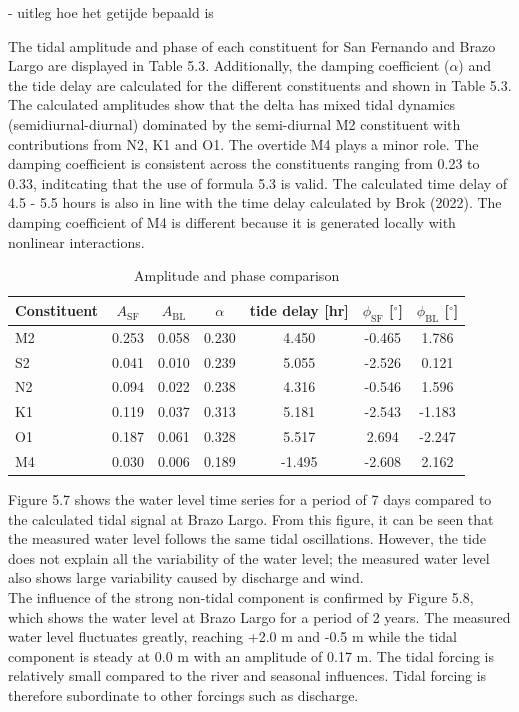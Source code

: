 - uitleg hoe het getijde bepaald is

The tidal amplitude and phase of each constituent for San Fernando and Brazo Largo are displayed in Table 5.3. Additionally, the damping coefficient ($\alpha$) and the tide delay are calculated for the different constituents and shown in Table 5.3. The calculated amplitudes show that the delta has mixed tidal dynamics  (semidiurnal-diurnal)
dominated by the semi-diurnal M2 constituent with contributions from N2, K1 and O1. The overtide M4 plays a minor role. The damping coefficient is consistent across the constituents ranging from 0.23 to 0.33, inditcating that the use of formula 5.3 is valid. The calculated time delay of 4.5 - 5.5 hours is also in line with the time delay calculated by Brok (2022). The damping coefficient of M4 is different because it is generated locally with nonlinear interactions.

\begin{table}[h!]
\centering
\caption{Amplitude and phase comparison}
\begin{tabular}{lcccccc}
\hline
Constituent & $A_{\text{SF}}$ & $A_{\text{BL}}$ & $\alpha$ & tide delay [hr] & $\phi_{\text{SF}}$ [$^\circ$] & $\phi_{\text{BL}}$ [$^\circ$] \\
\hline
M2 & 0.253 & 0.058 & 0.230 & 4.450 & -0.465 & 1.786 \\
S2 & 0.041 & 0.010 & 0.239 & 5.055 & -2.526 & 0.121 \\
N2 & 0.094 & 0.022 & 0.238 & 4.316 & -0.546 & 1.596 \\
K1 & 0.119 & 0.037 & 0.313 & 5.181 & -2.543 & -1.183 \\
O1 & 0.187 & 0.061 & 0.328 & 5.517 & 2.694 & -2.247 \\
M4 & 0.030 & 0.006 & 0.189 & -1.495 & -2.608 & 2.162 \\
\hline
\end{tabular}
\end{table}

Figure 5.7 shows the water level time series for a period of 7 days compared to the calculated tidal signal at Brazo Largo. From this figure, it can be seen that the measured water level follows the same tidal oscillations. However, the tide does not explain all the variability of the water level; the measured water level also shows large variability caused by discharge and wind. 
\\The influence of the strong non-tidal component is confirmed by Figure 5.8, which shows the water level at Brazo Largo for a period of 2 years. The measured water level fluctuates greatly, reaching +2.0 m and -0.5 m while the tidal component is steady at 0.0 m with an amplitude of 0.17 m. The tidal forcing is relatively small compared to the river and seasonal influences. Tidal forcing is therefore subordinate to other forcings such as discharge.

